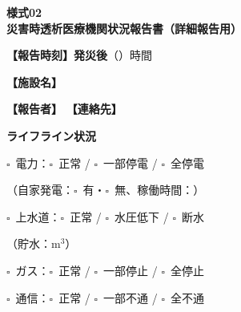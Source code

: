 \documentclass[a4paper,12pt]{jarticle}
\newcommand{\checkbox}{$\square$\ }
\newcommand{\underlinespace}[1]{\underline{\hspace{#1}}}
\begin{document}
\begin{center}
{\Large\textbf{様式02}}\\
\vspace{3mm}
{\Large\textbf{災害時透析医療機関状況報告書（詳細報告用）}}
\end{center}
\vspace{5mm}

\noindent
\textbf{【報告時刻】発災後}（\underlinespace{2cm}）時間

\vspace{5mm}

\noindent
\textbf{【施設名】} \underlinespace{10cm}

\vspace{3mm}

\noindent
\textbf{【報告者】} \underlinespace{4cm} \quad \textbf{【連絡先】} \underlinespace{5cm}

\vspace{8mm}

\begin{center}
\textbf{\large ライフライン状況}
\end{center}

\vspace{3mm}

\noindent
\checkbox 電力：\quad \checkbox 正常 \quad / \quad \checkbox 一部停電 \quad / \quad \checkbox 全停電

\vspace{2mm}

\noindent
（自家発電：\checkbox 有・\checkbox 無、稼働時間：\underlinespace{2cm}）

\vspace{3mm}

\noindent
\checkbox 上水道：\quad \checkbox 正常 \quad / \quad \checkbox 水圧低下 \quad / \quad \checkbox 断水

\vspace{2mm}

\noindent
（貯水：\underlinespace{2cm}m$^3$）

\vspace{3mm}

\noindent
\checkbox ガス：\quad \checkbox 正常 \quad / \quad \checkbox 一部停止 \quad / \quad \checkbox 全停止

\vspace{3mm}

\noindent
\checkbox 通信：\quad \checkbox 正常 \quad / \quad \checkbox 一部不通 \quad / \quad \checkbox 全不通
\end{document}
